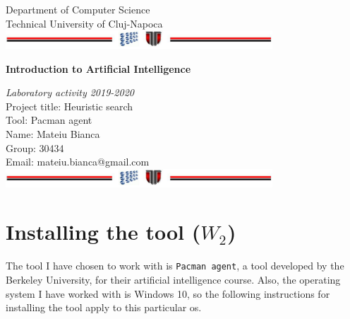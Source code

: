 \documentclass[a4paper,12pt]{report}
\begin{document}
\vspace{-5cm}
\begin{center}
Department of Computer Science\\
Technical University of Cluj-Napoca\\
\includegraphics[width=10cm]{fig/footer}
\end{center}
\vspace{1cm}
\begin{center}
\begin{Large}
\textbf{Introduction to Artificial Intelligence}\\
\end{Large}
\textit{Laboratory activity 2019-2020}\\
\vspace{3cm}
Project title:	Heuristic search\\
Tool: Pacman agent\\
\vspace{1.5cm}
Name: Mateiu Bianca\\
Group: 30434\\
Email: mateiu.bianca@gmail.com\\
\vspace{6cm}
\vspace{1cm}
\includegraphics[width=10cm]{fig/footer}
\end{center}

\tableofcontents

\chapter{Installing the tool ($W_2$)}

The tool I have chosen to work with is \texttt{Pacman agent}, a tool developed by the Berkeley University, for their artificial intelligence course.\cite{wiki:04} Also, the operating system I have worked with is Windows 10, so the following instructions for installing the tool apply to this particular os.
\end{document}
